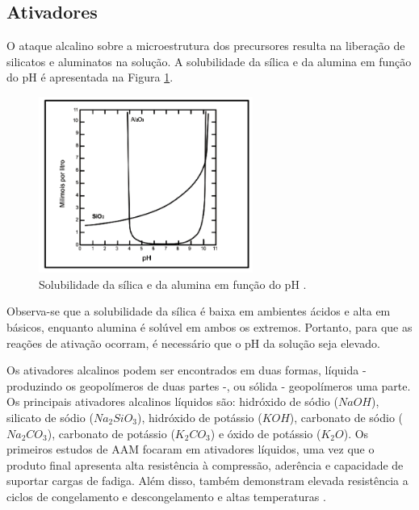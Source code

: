 

\subsection{Ativadores}

O ataque alcalino sobre a microestrutura dos precursores resulta na liberação de silicatos e aluminatos na solução.
A solubilidade da sílica e da alumina em função do pH é apresentada na Figura \ref{fig:solubilidade}.

\begin{figure}[ht]
  \centering
  \includegraphics[width=0.625\textwidth]{Cap2/solubilidade.png}
  \caption{Solubilidade da sílica e da alumina em função do pH \cite{mason1952principles}.}
  \label{fig:solubilidade}
\end{figure}

Observa-se que a solubilidade da sílica é baixa em ambientes ácidos e alta em básicos, enquanto alumina é solúvel em ambos os extremos.
Portanto, para que as reações de ativação ocorram, é necessário que o pH da solução seja elevado.

Os ativadores alcalinos podem ser encontrados em duas formas, líquida - produzindo os geopolímeros de duas partes -, ou sólida - geopolímeros uma parte.
Os principais ativadores alcalinos líquidos são: hidróxido de sódio ($NaOH$), silicato de sódio ($Na_2SiO_3$), hidróxido de potássio ($KOH$), carbonato de sódio ($Na_2CO_3$), carbonato de potássio ($K_2CO_3$) e óxido de potássio ($K_2O$).
Os primeiros estudos de AAM focaram em ativadores líquidos, uma vez que o produto final apresenta alta resistência à compressão, aderência e capacidade de suportar cargas de fadiga. Além disso, também demonstram elevada resistência a ciclos de congelamento e descongelamento e altas temperaturas \cite{heath2014gwp}.

